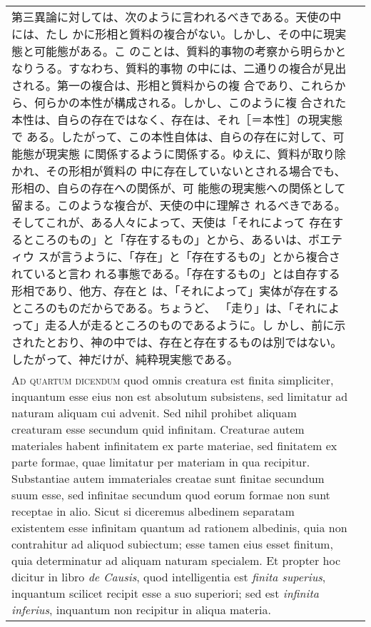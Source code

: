 \documentclass[10pt]{jsarticle} %
\begin{document}
\begin{longtable}{p{21em}p{21em}}
 第三異論に対しては、次のように言われるべきである。天使の中には、たし
 かに形相と質料の複合がない。しかし、その中に現実態と可能態がある。こ
 のことは、質料的事物の考察から明らかとなりうる。すなわち、質料的事物
 の中には、二通りの複合が見出される。第一の複合は、形相と質料からの複
 合であり、これらから、何らかの本性が構成される。しかし、このように複
 合された本性は、自らの存在ではなく、存在は、それ［＝本性］の現実態で
 ある。したがって、この本性自体は、自らの存在に対して、可能態が現実態
 に関係するように関係する。ゆえに、質料が取り除かれ、その形相が質料の
 中に存在していないとされる場合でも、形相の、自らの存在への関係が、可
 能態の現実態への関係として留まる。このような複合が、天使の中に理解さ
 れるべきである。そしてこれが、ある人々によって、天使は「それによって
 存在するところのもの」と「存在するもの」とから、あるいは、ボエティウ
 スが言うように、「存在」と「存在するもの」とから複合されていると言わ
 れる事態である。「存在するもの」とは自存する形相であり、他方、存在と
 は、「それによって」実体が存在するところのものだからである。ちょうど、
 「走り」は、「それによって」走る人が走るところのものであるように。し
 かし、前に示されたとおり、神の中では、存在と存在するものは別ではない。
 したがって、神だけが、純粋現実態である。

 \\
 
 {\scshape Ad quartum dicendum} quod omnis creatura est finita
 simpliciter, inquantum esse eius non est absolutum subsistens, sed
 limitatur ad naturam aliquam cui advenit. Sed nihil prohibet aliquam
 creaturam esse secundum quid infinitam. Creaturae autem materiales
 habent infinitatem ex parte materiae, sed finitatem ex parte formae,
 quae limitatur per materiam in qua recipitur. Substantiae autem
 immateriales creatae sunt finitae secundum suum esse, sed infinitae
 secundum quod eorum formae non sunt receptae in alio. Sicut si
 diceremus albedinem separatam existentem esse infinitam quantum ad
 rationem albedinis, quia non contrahitur ad aliquod subiectum; esse
 tamen eius esset finitum, quia determinatur ad aliquam naturam
 specialem. Et propter hoc dicitur in libro {\itshape de Causis}, quod
 intelligentia est {\itshape finita superius}, inquantum scilicet
 recipit esse a suo superiori; sed est {\itshape infinita inferius},
 inquantum non recipitur in aliqua materia.

 &


\end{longtable}
\end{document}
